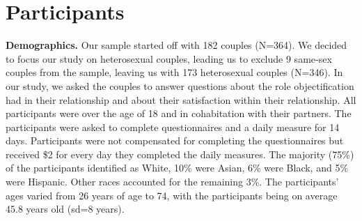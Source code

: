 \documentclass[
  english,
  man]{apa6}
\begin{document}
\hypertarget{participants}{%
\section{Participants}\label{participants}}

\textbf{Demographics.} Our sample started off with 182 couples (N=364). We decided to focus our study on heterosexual couples, leading us to exclude 9 same-sex couples from the sample, leaving us with 173 heterosexual couples (N=346). In our study, we asked the couples to answer questions about the role objectification had in their relationship and about their satisfaction within their relationship. All participants were over the age of 18 and in cohabitation with their partners. The participants were asked to complete questionnaires and a daily measure for 14 days. Participants were not compensated for completing the questionnaires but received \$2 for every day they completed the daily measures. The majority (75\%) of the participants identified as White, 10\% were Asian, 6\% were Black, and 5\% were Hispanic. Other races accounted for the remaining 3\%. The participants' ages varied from 26 years of age to 74, with the participants being on average 45.8 years old (sd=8 years).
\end{document}
